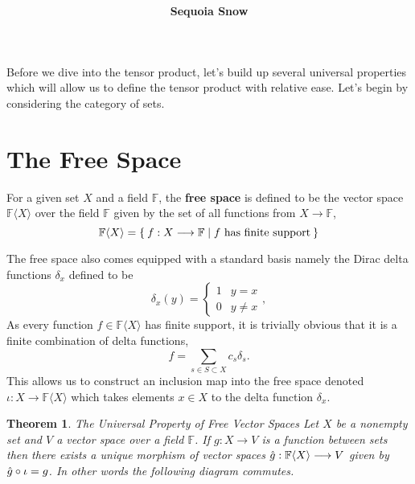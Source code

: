 \documentclass[12pt]{extarticle}
\title{
\textmd{\textbf{\articletile}}\\
}
\author{\textbf{Sequoia Snow}}
\date{}
\newtheorem*{theorem}{Theorem}
\newcommand{\freespace}[1] {{\F\langle #1 \rangle}}
\renewcommand{\to}[0]{\longrightarrow}
\newcommand{\F}{{\mathbb{F}}}
\begin{document}
\maketitle

Before we dive into the tensor product, let's build up several universal properties which will allow us to define the tensor product with relative ease. Let's begin by considering the category of sets.

\section*{The Free Space}

For a given set $X$ and a field $\F$, the \textbf{free space} is defined to be the vector space $\freespace{X}$ over the field $\F$ given by the set of all functions from $X \to \F$,
\[
  \freespace{X} = \Set{ f : X \to \F \mid \text{$f$ has finite support} }
\]

The free space also comes equipped with a standard basis namely the Dirac delta functions $\delta_x$ defined to be 
\[
  \delta_x(y) = \begin{cases}
    1 & y = x \\
    0 & y \neq x
  \end{cases},
\]
As every function $f \in \freespace{X}$ has finite support, it is trivially obvious that it is a finite combination of delta functions,
\[
  f = \sum_{s \in S \subset X} c_s \delta_s.
\]
This allows us to construct an inclusion map into the free space denoted $\iota: X \to \freespace{X}$ which takes elements $x \in X$ to the delta function $\delta_x$.

\begin{theorem}{The Universal Property of Free Vector Spaces}
  Let $X$ be a nonempty set and $V$ a vector space over a field $\F$. If $g : X \to V$ is a function between sets then there exists a unique morphism of vector spaces $\Hat{g} : \freespace{X} \to V$ given by $\Hat{g} \circ \iota = g$. In other words the following diagram commutes. 
  
  \begin{center}
  \end{center}
\end{theorem}
\end{document}
